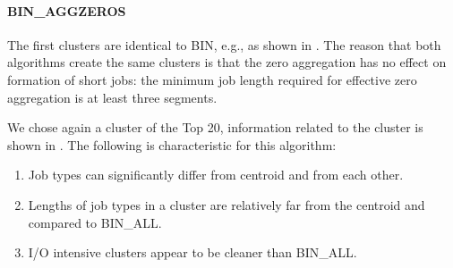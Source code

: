 \documentclass{jhps}
\begin{document}
\paragraph{BIN\_AGGZEROS}
The first clusters are identical to BIN, e.g., as shown in .
The reason that both algorithms create the same clusters is that the zero aggregation has no effect on formation of short jobs: the minimum job length required for effective zero aggregation is at least three segments.

We chose again a cluster of the Top 20, information related to the cluster is shown in .
The following is characteristic for this algorithm:

\begin{enumerate}
 \item Job types can significantly differ from centroid and from each other.
 \item Lengths of job types in a cluster are relatively far from the centroid and compared to BIN\_ALL.
 \item I/O intensive clusters appear to be cleaner than BIN\_ALL.
\end{enumerate}
\end{document}

